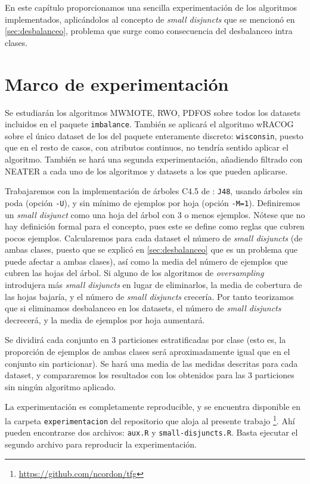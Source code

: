 En este capítulo proporcionamos una sencilla experimentación de los algoritmos implementados, aplicándolos al concepto de 
\textit{small disjuncts} que se mencionó en \ref{sec:desbalanceo}, problema que surge como consecuencia del desbalanceo
intra clases.

\section{Marco de experimentación}
Se estudiarán los algoritmos MWMOTE, RWO, PDFOS sobre todos los datasets incluidos en el paquete \texttt{imbalance}. 
También se aplicará el algoritmo wRACOG sobre el único dataset de los del paquete enteramente discreto: \texttt{wisconsin},
puesto que en el resto de casos, con atributos continuos, no tendría sentido aplicar el algoritmo. También se hará una 
segunda experimentación, añadiendo filtrado con NEATER a cada uno de los algoritmos y datasets a los que pueden aplicarse.

Trabajaremos con la implementación de árboles C4.5 de : \texttt{J48}, usando árboles sin poda 
(opción \texttt{-U}), y sin mínimo de ejemplos por hoja (opción \texttt{-M=1}). 
Definiremos un \textit{small disjunct} como una hoja del árbol con 3 o menos ejemplos. Nótese 
que no hay definición formal para el concepto, pues este se define como reglas que cubren pocos ejemplos. Calcularemos para 
cada dataset el número de \textit{small disjuncts} (de ambas clases, puesto que se explicó en \ref{sec:desbalanceo} que 
es un problema que puede afectar a ambas clases), así como la media del número de ejemplos que cubren las hojas del árbol.
Si alguno de los algoritmos de \textit{oversampling} introdujera más \textit{small disjuncts} en lugar de eliminarlos, 
la media de cobertura de las hojas bajaría, y el número de \textit{small disjuncts} crecería. Por tanto teorizamos que si eliminamos 
desbalanceo en los datasets, el número de \textit{small disjuncts} decrecerá, y la media de ejemplos por hoja aumentará.

Se dividirá cada conjunto en 3 particiones estratificadas por clase (esto es, la proporción de ejemplos de ambas
clases será aproximadamente igual que en el conjunto sin particionar). Se hará una media de las medidas descritas para cada
dataset, y compararemos los resultados con los obtenidos para las 3 particiones sin ningún algoritmo aplicado.

La experimentación es completamente reproducible, y se encuentra disponible en la carpeta \texttt{experimentacion} del 
repositorio que aloja al presente trabajo \footnote{\url{https://github.com/ncordon/tfg}}.
Ahí pueden encontrarse dos archivos: \texttt{aux.R} y \texttt{small-disjuncts.R}. Basta ejecutar el segundo archivo
para reproducir la experimentación.

